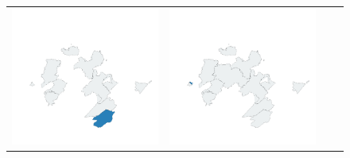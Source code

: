 \begin{figure}
\begin{tabularx}{1\textwidth}{XXXX}
\includegraphics[width=1\linewidth]{images/ch6/loading/07}&
\includegraphics[width=1\linewidth]{images/ch6/loading/08} \\

\end{tabularx}
\end{figure}
